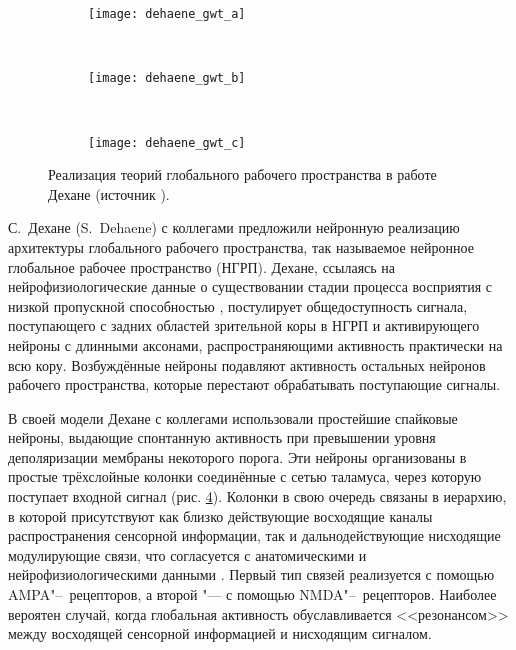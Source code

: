 \begin{figure}[h]
	\centering
	\begin{subfigure}[b]{0.3\textwidth}
		\texttt{[image: dehaene\_gwt\_a]}
		\caption{}
		\label{fg:dehaene_gwt_a}
	\end{subfigure}
	~ 
	\begin{subfigure}[b]{0.3\textwidth}
		\texttt{[image: dehaene\_gwt\_b]}
		\caption{}
		\label{fg:dehaene_gwt_b}
	\end{subfigure}
	~ 
	\begin{subfigure}[b]{0.3\textwidth}
		\texttt{[image: dehaene\_gwt\_c]}
		\caption{}
		\label{fg:dehaene_gwt_c}
	\end{subfigure}
	\caption{Реализация теорий глобального рабочего пространства в работе Дехане (источник \cite{Dehaene2003}).}
	\label{fg:dehaene_gwt}
\end{figure}

С.~Дехане (S.~Dehaene) с коллегами \cite{Dehaene2003} предложили нейронную реализацию архитектуры глобального рабочего пространства, так называемое нейронное глобальное рабочее пространство (НГРП). Дехане, ссылаясь на нейрофизиологические данные о существовании стадии процесса восприятия с низкой пропускной способностью \cite{Chun1995}, постулирует общедоступность сигнала, поступающего с задних областей зрительной коры в НГРП и активирующего нейроны с длинными аксонами, распространяющими активность практически на всю кору. Возбуждённые нейроны подавляют активность остальных нейронов рабочего пространства, которые перестают обрабатывать поступающие сигналы. 

В своей модели Дехане с коллегами использовали простейшие спайковые нейроны, выдающие спонтанную активность при превышении уровня деполяризации мембраны некоторого порога. Эти нейроны организованы в простые трёхслойные колонки соединённые с сетью таламуса, через которую поступает входной сигнал (рис. \ref{fg:dehaene_gwt}). Колонки в свою очередь связаны в иерархию, в которой присутствуют как близко действующие восходящие каналы распространения сенсорной информации, так и дальнодействующие нисходящие модулирующие связи, что согласуется с анатомическими и нейрофизиологическими данными \cite{Lamme2000,Felleman1991}. Первый тип связей реализуется с помощью AMPA"--~рецепторов, а второй "--- с помощью NMDA"--~рецепторов. Наиболее вероятен случай, когда глобальная активность обуславливается <<резонансом>> \cite{Llinas1998} между восходящей сенсорной информацией и нисходящим сигналом.

